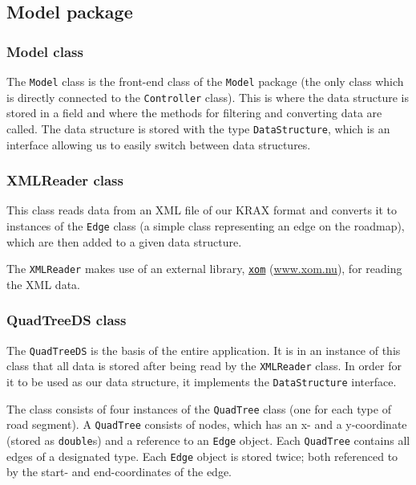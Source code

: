 \documentclass[a4paper,11pt]{article}
\begin{document}
\subsection{Model package} %

\subsubsection{Model class} %
The \texttt{Model} class is the front-end class of the \texttt{Model} package (the only class which is directly connected to the \texttt{Controller} class). This is where the data structure is stored in a field and where the methods for filtering and converting data are called. The data structure is stored with the type \texttt{DataStructure}, which is an interface allowing us to easily switch between data structures.

\subsubsection{XMLReader class} %
This class reads data from an XML file of our KRAX format and converts it to instances of the \texttt{Edge} class (a simple class representing an edge on the roadmap), which are then added to a given data structure.

The \texttt{XMLReader} makes use of an external library, \href{www.xom.nu}{\texttt{xom}} (\url{www.xom.nu}), for reading the XML data.

\subsubsection{QuadTreeDS class} %
The \texttt{QuadTreeDS} is the basis of the entire application. It is in an instance of this class that all data is stored after being read by the \texttt{XMLReader} class. In order for it to be used as our data structure, it implements the \texttt{DataStructure} interface.

The class consists of four instances of the \texttt{QuadTree} class (one for each type of road segment). A \texttt{QuadTree} consists of nodes, which has an x- and a y-coordinate (stored as \texttt{double}s) and a reference to an \texttt{Edge} object. Each \texttt{QuadTree} contains all edges of a designated type. Each \texttt{Edge} object is stored twice; both referenced to by the start- and end-coordinates of the edge.
\end{document}
